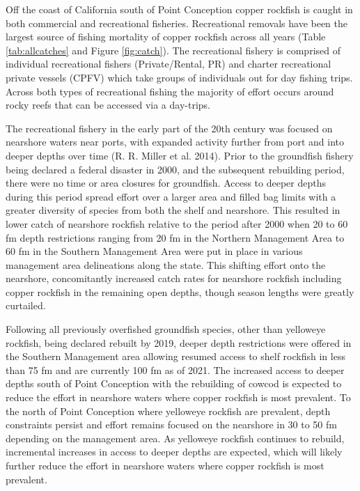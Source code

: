 \documentclass[11pt,
  english,
  letterpaper,
]{article}
\begin{document}
Off the coast of California south of Point Conception copper rockfish is caught in both commercial and recreational fisheries. Recreational removals have been the largest source of fishing mortality of copper rockfish across all years (Table \ref{tab:allcatches} and Figure \ref{fig:catch}). The recreational fishery is comprised of individual recreational fishers (Private/Rental, PR) and charter recreational private vessels (CPFV) which take groups of individuals out for day fishing trips. Across both types of recreational fishing the majority of effort occurs around rocky reefs that can be accessed via a day-trips.

The recreational fishery in the early part of the 20th century was focused on nearshore waters near ports, with expanded activity further from port and into deeper depths over time (R. R. Miller et al. 2014). Prior to the groundfish fishery being declared a federal disaster in 2000, and the subsequent rebuilding period, there were no time or area closures for groundfish. Access to deeper depths during this period spread effort over a larger area and filled bag limits with a greater diversity of species from both the shelf and nearshore. This resulted in lower catch of nearshore rockfish relative to the period after 2000 when 20 to 60 fm depth restrictions ranging from 20 fm in the Northern Management Area to 60 fm in the Southern Management Area were put in place in various management area delineations along the state. This shifting effort onto the nearshore, concomitantly increased catch rates for nearshore rockfish including copper rockfish in the remaining open depths, though season lengths were greatly curtailed.

Following all previously overfished groundfish species, other than yelloweye rockfish, being declared rebuilt by 2019, deeper depth restrictions were offered in the Southern Management area allowing resumed access to shelf rockfish in less than 75 fm and are currently 100 fm as of 2021. The increased access to deeper depths south of Point Conception with the rebuilding of cowcod is expected to reduce the effort in nearshore waters where copper rockfish is most prevalent. To the north of Point Conception where yelloweye rockfish are prevalent, depth constraints persist and effort remains focused on the nearshore in 30 to 50 fm depending on the management area. As yelloweye rockfish continues to rebuild, incremental increases in access to deeper depths are expected, which will likely further reduce the effort in nearshore waters where copper rockfish is most prevalent.
\end{document}
